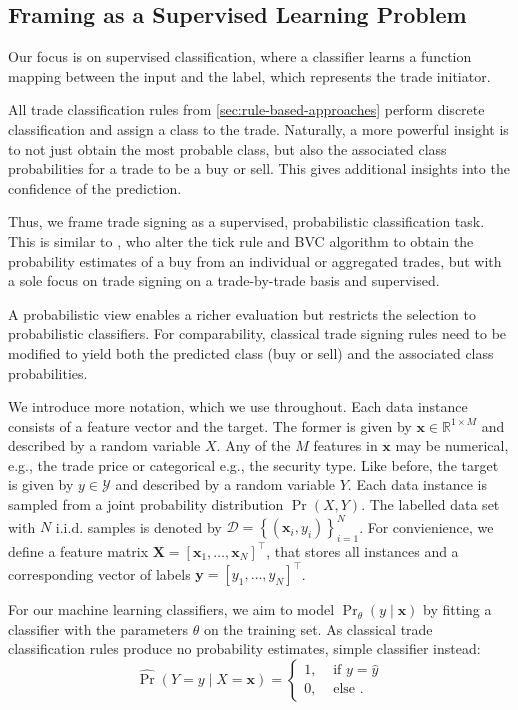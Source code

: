 \subsection{Framing as a Supervised Learning Problem}\label{sec:problem-framing}

Our focus is on supervised classification, where a classifier learns a function mapping between the input and the label, which represents the trade initiator.

All trade classification rules from \cref{sec:rule-based-approaches} perform discrete classification and assign a class to the trade. Naturally, a more powerful insight is to not just obtain the most probable class, but also the associated class probabilities for a trade to be a buy or sell. This gives additional insights into the confidence of the prediction.

Thus, we frame trade signing as a supervised, probabilistic classification task. This is similar to \textcite[][272]{easleyDiscerningInformationTrade2016}, who alter the tick rule and \gls{BVC} algorithm to obtain the probability estimates of a buy from an individual or aggregated trades, but with a sole focus on trade signing on a trade-by-trade basis and supervised.

A probabilistic view enables a richer evaluation but restricts the selection to probabilistic classifiers. For comparability, classical trade signing rules need to be modified to yield both the predicted class (buy or sell) and the associated class probabilities.

We introduce more notation, which we use throughout. Each data instance consists of a feature vector and the target. The former is given by $\mathbf{x} \in \mathbb{R}^{1 \times M}$ and described by a random variable $X$. Any of the $M$ features in $\mathbf{x}$ may be numerical, e.g., the trade price or categorical e.g., the security type. Like before, the target is given by $y \in \mathcal{Y}$ and described by a random variable $Y$. Each data instance is sampled from a joint probability distribution $\Pr(X, Y)$. The labelled data set with $N$ i.i.d. samples is denoted by $\mathcal{D} =\left\{\left(\mathbf{x}_i, y_i\right)\right\}_{i=1}^N$. For convienience, we define a feature matrix $\mathbf{X}=\left[\mathbf{x}_1,\ldots, \mathbf{x}_N\right]^{\top}$, that stores all instances and a corresponding vector of labels $\mathbf{y}=\left[y_1,\ldots, y_N \right]^{\top}$.

For our machine learning classifiers, we aim to model $\Pr_{\theta}(y \mid \mathbf{x})$ by fitting a classifier with the parameters $\theta$ on the training set. As classical trade classification rules produce no probability estimates, simple classifier instead:
\begin{equation}
    \widehat{\operatorname{Pr}}(Y=y\mid X=\mathbf{x})= \begin{cases}1, & \text { if } y=\hat{y} \\ 0, & \text { else }.\end{cases}
    \label{eq:prob-from-point-estimate}
\end{equation}

